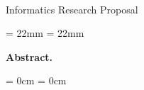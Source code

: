 \thispagestyle{plain}

\begin{center}
  \Huge
  \textbf{\@title}\\
  \vspace{.5em}
  \normalsize
  Informatics Research Proposal\\
  \@author
  \vspace{.4em}
\end{center}

\newcommand{\abstractmargin}{22mm}

\leftskip  = \abstractmargin
\rightskip = \abstractmargin

\small
\noindent
\textbf{Abstract.}


\leftskip  = 0cm
\rightskip = 0cm
